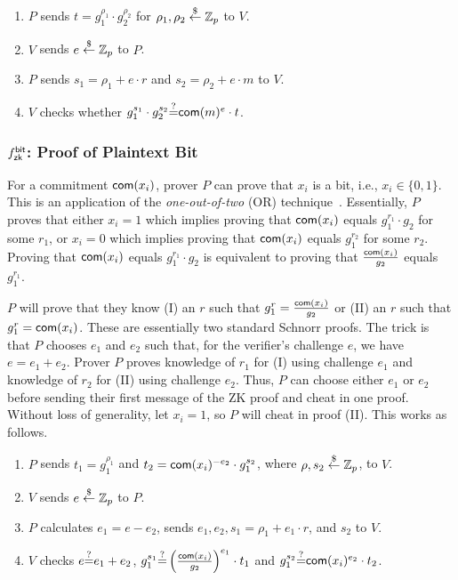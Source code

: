\begin{enumerate}[leftmargin=*]
\item $P$ sends $t=g_1^{\rho_1}\cdot{}g_2^{\rho_2}$ for
  $\rho_1,\rho_2\stackrel{\$}{\leftarrow}\mathbb{Z}_p$ to $V$.
\item $V$ sends $e\stackrel{\$}{\leftarrow}\mathbb{Z}_p$ to $P$.
  \item $P$ sends $s_1=\rho_1+e\cdot{}r$ and $s_2=\rho_2+e\cdot{}m$ to
    $V$.
    \item $V$ checks whether $g_1^{s_1}\cdot{}g_2^{s_2}{\stackrel{?}{=}}\mathsf{com}(m)^e\cdot{}t$.
\end{enumerate}

\subsubsection{${f^{\mathsf{bit}}_{\mathsf{zk}}}$: Proof of Plaintext Bit }
\label{pobit}
For a commitment $\mathsf{com}(x_i)$, prover $P$ can prove that $x_i$ is a
bit, i.e., $x_i\in\{0,1\}$. This is an application of the
\emph{one-out-of-two} (OR) technique~\cite{ooot}. Essentially, $P$
proves that either $x_i=1$ which implies proving that ${\mathsf{com}(x_i)}$
equals ${g_1^{r_1}\cdot{}g_2}$ for some $r_1$, or $x_i=0$ which implies
proving that $\mathsf{com}(x_i)$ equals $g_1^{r_2}$ for some $r_2$. Proving
that ${\mathsf{com}(x_i)}$ equals ${g_1^{r_1}\cdot{}g_2}$ is equivalent to
proving that $\frac{{\mathsf{com}(x_i)}}{g_2}$ equals ${g_1^{r_1}}$.

$P$ will prove that they know (I) an $r$ such that
$g_1^{r}=\frac{{\mathsf{com}(x_i)}}{g_2}$ or (II) an $r$ such that
$g_1^{r}=\mathsf{com}(x_i)$. These are essentially two standard Schnorr
proofs.  The trick is that $P$ chooses $e_1$ and $e_2$ such that, for
the verifier's challenge $e$, we have $e=e_1+e_2$. Prover $P$ proves
knowledge of $r_1$ for (I) using challenge $e_1$ and knowledge of
$r_2$ for (II) using challenge $e_2$. Thus, $P$ can choose either
$e_1$ or $e_2$ before sending their first message of the ZK proof and
cheat in one proof. Without loss of generality, let $x_i=1$, so $P$
will cheat in proof (II). This works as follows.

\begin{enumerate}[leftmargin=*]
\item $P$ sends $t_1=g_1^{\rho_1}$ and
  $t_2=\mathsf{com}(x_i)^{-e_2}\cdot{}g_1^{s_2}$, where $\rho,s_2\stackrel{\$}{\leftarrow}\mathbb{Z}_p$, to
  $V$.
\item $V$ sends $e\stackrel{\$}{\leftarrow}\mathbb{Z}_p$ to $P$.
  \item $P$ calculates $e_1 = e - e_2$, sends $e_1,e_2,s_1=\rho_1+e_1\cdot{}r$, and $s_2$ to $V$.

\item $V$ checks $e{\stackrel{?}{=}}{}e_1+e_2$, $g_1^{s_1}{\stackrel{?}{=}}{}\left(\frac{\mathsf{com}(x_i)}{g_2}\right)^{e_1}\cdot{}t_1$ and $g_1^{s_2}{\stackrel{?}{=}}{}\mathsf{com}(x_i)^{e_2}\cdot{}t_2$.
\end{enumerate}

